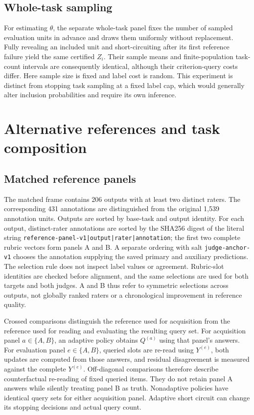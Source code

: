 \subsection{Whole-task sampling}
\label{app:whole-task}

For estimating $\theta$, the separate whole-task panel fixes the number of
sampled evaluation units in advance and draws them uniformly without
replacement. Fully revealing an included unit and short-circuiting after
its first reference failure yield the same certified $Z_i$. Their sample
means and finite-population task-count intervals are consequently identical,
although their criterion-query costs differ. Here sample size is fixed and
label cost is random. This experiment is distinct from stopping task
sampling at a fixed label cap, which would generally alter inclusion
probabilities and require its own inference.

\section{Alternative references and task composition}
\label{app:sensitivity}

\subsection{Matched reference panels}
\label{app:reference}

The matched frame contains 206 outputs with at least two distinct raters.
The corresponding 431 annotations are distinguished from the original
1,539 annotation units. Outputs are sorted by base-task and output identity.
For each output, distinct-rater annotations are sorted by the SHA256 digest
of the literal string
\texttt{reference-panel-v1|output|rater|annotation}; the first two complete
rubric vectors form panels A and B. A separate ordering with salt
\texttt{judge-anchor-v1} chooses the annotation supplying the saved primary
and auxiliary predictions. The selection rule does not inspect label values
or agreement. Rubric-slot identities are checked before alignment, and the
same selections are used for both targets and both judges. A and B thus
refer to symmetric selections across outputs, not globally ranked raters or
a chronological improvement in reference quality.

Crossed comparisons distinguish the reference used for acquisition from
the reference used for reading and evaluating the resulting query set.
For acquisition panel $a\in\{A,B\}$, an adaptive policy obtains $Q^{(a)}$
using that panel's answers. For evaluation panel $e\in\{A,B\}$, queried
slots are re-read using $Y^{(e)}$, both updates are computed from those
answers, and residual disagreement is measured against the complete
$Y^{(e)}$. Off-diagonal comparisons therefore describe counterfactual
re-reading of fixed queried items. They do not retain panel A answers while
silently treating panel B as truth. Nonadaptive policies have identical
query sets for either acquisition panel. Adaptive short circuit can change
its stopping decisions and actual query count.

